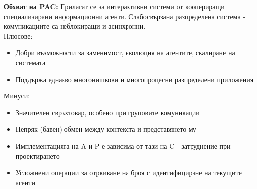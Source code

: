 \documentclass[11pt]{article} %
\begin{document}
\textbf{Обхват на PAC:} Прилагат се за интерактивни системи от коопериращи специализирани информационни агенти. Слабосвързана разпределена система - комуникациите са неблокиращи и асинхронни.\\
Плюсове:
\begin{itemize}[noitemsep]
	\item Добри възможности за заменимост, еволюция на агентите, скалиране на системата
	\item Поддържа еднакво многонишкови и многопроцесни разпределени приложения 
\end{itemize}
Минуси:
\begin{itemize}[noitemsep]
	\item Значителен свръхтовар, особено при груповите комуникации
	\item Непряк (бавен) обмен между контекста и представянето му
	\item Имплементацията на A и P е зависима от тази на C - затруднение при проектирането
	\item Усложнени операции за отркиване на броя с идентифициране на текущите агенти
\end{itemize}
\end{document}

